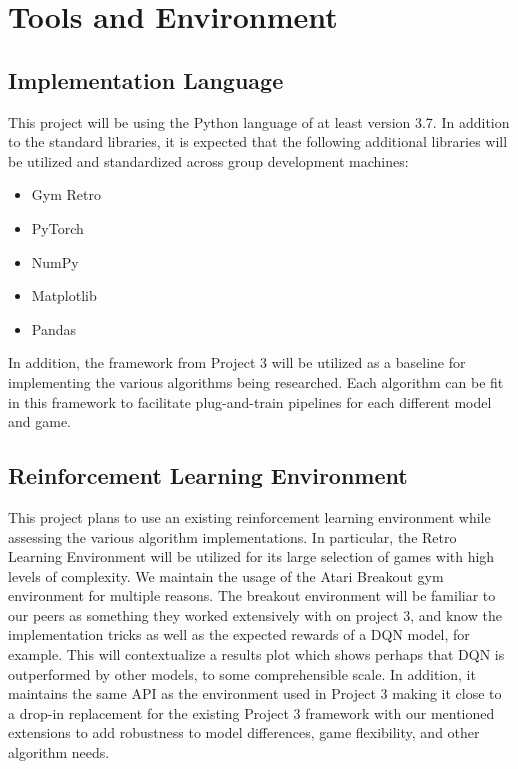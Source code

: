 \documentclass[conference]{IEEEtran}
\begin{document}
\section{Tools and Environment}

\subsection{Implementation Language}
This project will be using the Python language of at least version 3.7.
In addition to the standard libraries, it is expected that the following additional libraries will be utilized and standardized across group development machines:
 
\begin{itemize}
    \item Gym Retro \cite{nichol2018retro}
    \item PyTorch
    \item NumPy
    \item Matplotlib
    \item Pandas
\end{itemize}

In addition, the framework from Project 3 will be utilized as a baseline for implementing the various algorithms being researched. Each algorithm can be fit in this framework to facilitate plug-and-train pipelines for each different model and game.

\subsection{Reinforcement Learning Environment}
This project plans to use an existing reinforcement learning environment while assessing the various algorithm implementations.
In particular, the Retro Learning Environment \cite{nichol2018retro} will be utilized for its large selection of games with high levels of complexity.
We maintain the usage of the Atari Breakout gym environment for multiple reasons. The breakout environment will be familiar to our peers as something they worked extensively with on project 3, and know the implementation tricks as well as the expected rewards of a DQN model, for example. This will contextualize a results plot which shows perhaps that DQN is outperformed by other models, to some comprehensible scale.
In addition, it maintains the same API as the environment used in Project 3 making it close to a drop-in replacement for the existing Project 3 framework with our mentioned extensions to add robustness to model differences, game flexibility, and other algorithm needs.
\end{document}
